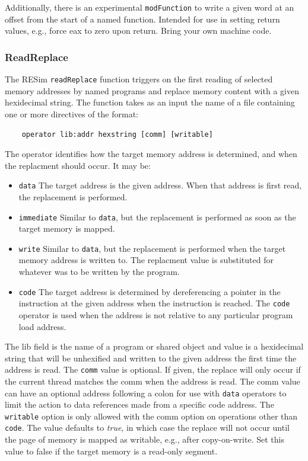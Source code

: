 \documentclass[titlepage]{article}
\begin{document}
Additionally, there is an experimental {\tt modFunction} to write a given word at an offset from the start of a named function.  
Intended for use in setting return values, e.g., force eax to zero upon return.  Bring your own machine code.  

\subsubsection{ReadReplace}
\label{read-replace}
The RESim {\tt readReplace} function triggers on the first reading of selected memory addresses
by named programs and replace memory content with a given hexidecimal string.  The function takes as an
input the name of a file containing one or more directives of the format:
\begin{verbatim}
    operator lib:addr hexstring [comm] [writable]
\end{verbatim}

The operator identifies how the target memory address is determined, and when the replacment should occur.  It may be:  
\begin{itemize}
\item {\tt data} The target address is the given address.  When that address is first read, the replacement is performed.
\item {\tt immediate} Similar to {\tt data}, but the replacement is performed as soon as the target memory is mapped.
\item {\tt write} Similar to {\tt data}, but the replacement is performed when the target memory address is written to.  The replacment
value is substituted for whatever was to be written by the program.
\item {\tt code} The target address is determined by dereferencing a pointer in the instruction
at the given address when the instruction is reached.  The {\tt code} operator is used when the address is not relative
to any particular program load address. 
\end{itemize}

The lib field is the name of a program or shared object and value
is a hexidecimal string that will be unhexified and written to the given
address the first time the address is read.  
The {\tt comm} value is optional.  If given, the replace will only occur if the
current thread matches the comm when the address is read.  The comm value can have
an optional address following a colon for use with {\tt data} operators to limit the
action to data references made from a specific code address. 
The {\tt writable} option is only allowed with the comm option on operations other than {\tt code}. The value defaults to \textit{true},
in which case the replace will not occur until the page of memory is mapped as writable, e.g., after copy-on-write.  Set this value to 
false if the target memory is a read-only segment.
\end{document}
